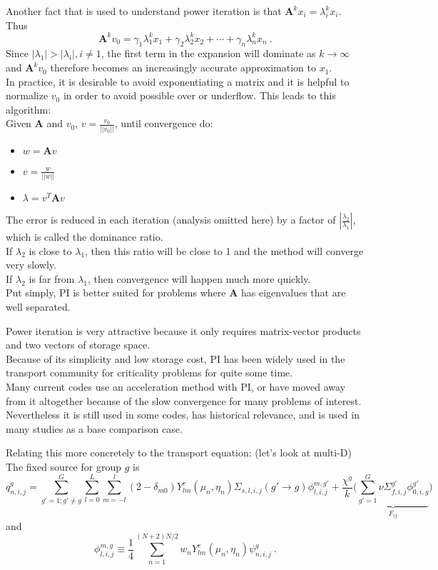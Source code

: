 \documentclass[12pt]{article}
\newcommand{\ve}[1]{\ensuremath{\mathbf{#1}}}
\begin{document}
Another fact that is used to understand power iteration is that $\ve{A}^k x_i = \lambda_i^k x_i$. Thus
%
\begin{equation}
  \ve{A}^k v_{0} = \gamma_1 \lambda_1^k x_1 + \gamma_2 \lambda_2^k x_2 + \cdots + \gamma_n \lambda_n^k x_n \:.
  \label{eq:Ak}
\end{equation}
%
Since $|\lambda_1| > |\lambda_i|, i \ne 1$, the first term in the expansion will dominate as $k \to \infty$ and $\ve{A}^k v_{0}$ therefore becomes an increasingly accurate approximation to $x_1$.\\ 
In practice, it is desirable to avoid exponentiating a matrix and it is helpful to normalize $v_0$ in order to avoid possible over or underflow. This leads to this algorithm:\\
Given $\ve{A}$ and $v_0$, $v = \frac{v_{0}}{||v_{0}||}$, until convergence do:
\begin{itemize}
    \item $w = \ve{A}v$
    \item $v = \frac{w}{||w||}$
    \item $\lambda = v^{T}\ve{A}v$
\end{itemize}
%
The error is reduced in each iteration (analysis omitted here) by a factor of $|\frac{\lambda_{2}}{\lambda_{1}}|$, which is called the dominance ratio. \\
If $\lambda_2$ is close to $\lambda_1$, then this ratio will be close to 1 and the method will converge very slowly. \\
If $\lambda_2$ is far from $\lambda_1$, then convergence will happen much more quickly. \\
Put simply, PI is better suited for problems where $\ve{A}$ has eigenvalues that are well separated.

Power iteration is very attractive because it only requires matrix-vector products and two vectors of storage space. \\
Because of its simplicity and low storage cost, PI has been widely used in the transport community for criticality problems for quite some time. \\
Many current codes use an acceleration method with PI, or have moved away from it altogether because of the slow convergence for many problems of interest. \\
Nevertheless it is still used in some codes, has historical relevance, and is used in many studies as a base comparison case. 

\vspace*{1 em}
Relating this more concretely to the transport equation: (let's look at multi-D)
\\
The fixed source for group $g$ is
\[
q_{n,i,j}^g = \sum_{g'=1; g' \neq g}^G \sum_{l=0}^L \sum_{m=-l}^l (2 - \delta_{m0})Y_{lm}^e(\mu_n, \eta_n) \Sigma_{s,l,i,j}(g' \rightarrow g) \phi_{l,i,j}^{m,g'} + \frac{\chi^g}{k}\bigl(\underbrace{\sum_{g'=1}^G \nu \Sigma_{f,i,j}^{g'} \phi_{0,i,g}^{g'}}_{F_{ij}} \bigr)
\]
and
\[
\phi_{l,i,j}^{m,g} \equiv \frac{1}{4}\sum_{n=1}^{(N+2)N/2} w_n Y_{lm}^e(\mu_n, \eta_n) \psi_{n,i,j}^g\:.
\]
\end{document}

